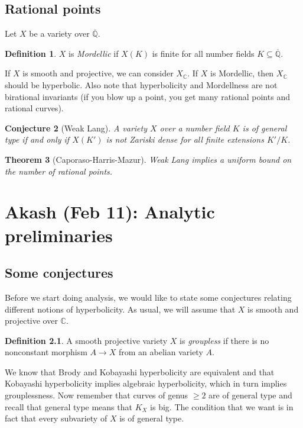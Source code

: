 \documentclass[leqno, openany]{memoir}
\newtheorem{thm}{Theorem}[section]
\newtheorem{conj}[thm]{Conjecture}
\theoremstyle{definition}
\newtheorem{defn}[thm]{Definition}
\theoremstyle{remark}
\theoremstyle{plain}
\theoremstyle{definition}
\theoremstyle{remark}
\newcommand{\C}{\mathbb{C}}
\newcommand{\Q}{\mathbb{Q}}
\newcommand{\ol}[1]{\overline{#1}}
\begin{document}
\section{Rational points}
Let $X$ be a variety over $\ol{\Q}$.
\begin{defn}
    $X$ is \textit{Mordellic} if $X(K)$ is finite for all number fields $K \subseteq \ol{\Q}$.
\end{defn}

If $X$ is smooth and projective, we can consider $X_{\C}$. If $X$ is Mordellic, then $X_{\C}$ should be hyperbolic. Also note that hyperbolicity and Mordellness are not birational invariants (if you blow up a point, you get many rational points and rational curves).

\begin{conj}[Weak Lang]
    A variety $X$ over a number field $K$ is of general type if and only if $X(K')$ is not Zariski dense for all finite extensions $K'/K$.
\end{conj}

\begin{thm}[Caporaso-Harris-Mazur]
    Weak Lang implies a uniform bound on the number of rational points.
\end{thm}

\chapter{Akash (Feb 11): Analytic preliminaries}%

\section{Some conjectures}

Before we start doing analysis, we would like to state some conjectures relating different notions of hyperbolicity. As usual, we will assume that $X$ is smooth and projective over $\C$.

\begin{defn}
    A smooth projective variety $X$ is \textit{groupless} if there is no nonconstant morphism $A \to X$ from an abelian variety $A$.
\end{defn}

We know that Brody and Kobayashi hyperbolicity are equivalent and that Kobayashi hyperbolicity implies algebraic hyperbolicity, which in turn implies grouplessness. Now remember that curves of genus $\geq 2$ are of general type and recall that general type means that $K_X$ is big. The condition that we want is in fact that every subvariety of $X$ is of general type.
\end{document}
